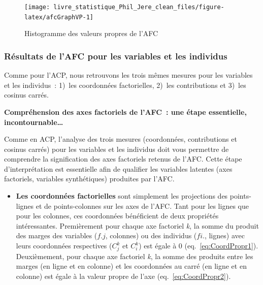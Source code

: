 \documentclass[
  11pt,
  french,
]{book}
\makeatletter
\providecommand{\tightlist}{%
  \setlength{\itemsep}{0pt}\setlength{\parskip}{0pt}}
\newenvironment{kframev}{%
\medskip{}
\setlength{\fboxsep}{.8em}
 \def\at@end@of@kframev{}%
 \ifinner\ifhmode%
  \def\at@end@of@kframev{\end{minipage}}%
  \begin{minipage}{\columnwidth}%
 \fi\fi%
 \def\FrameCommand##1{\hskip\@totalleftmargin \hskip-\fboxsep
 \colorbox{shadebluecolor}{##1}\hskip-\fboxsep
     \hskip-\linewidth \hskip-\@totalleftmargin \hskip\columnwidth}%
 \MakeFramed {\advance\hsize-\width
   \@totalleftmargin\z@ \linewidth\hsize
   \@setminipage}}%
 {\par\unskip\endMakeFramed%
 \at@end@of@kframev}
\newenvironment{rmdblock}[1]
  {
  \begin{itemize}
  \renewcommand{\labelitemi}{
    \raisebox{-.7\height}[0pt][0pt]{
      {\setkeys{Gin}{width=3em,keepaspectratio}\texttt{[image: images/\#1]}}
    }
  }
  \setlength{\fboxsep}{1em}
  \begin{kframev}
  \small
  \item
  }
  {
  \end{kframev}
  \end{itemize}
  }
\newenvironment{bloc_objectif}
  {\begin{rmdblock}{objectif}}
  {\end{rmdblock}}
\makeatother
\begin{document}
\begin{figure}

{\centering \texttt{[image: livre\_statistique\_Phil\_Jere\_clean\_files/figure-latex/afcGraphVP-1]} 

}

\caption{Histogramme des valeurs propres de l'AFC}\label{fig:afcGraphVP}
\end{figure}

\hypertarget{sect12322}{%
\subsubsection{Résultats de l'AFC pour les variables et les individus}\label{sect12322}}

Comme pour l'ACP, nous retrouvons les trois mêmes mesures pour les variables et les individus~: 1)~les coordonnées factorielles, 2)~les contributions et 3)~les cosinus carrés.

\begin{bloc_objectif}
\textbf{Compréhension des axes factoriels de l'AFC~: une étape essentielle, incontournable\ldots{}}

Comme en ACP, l'analyse des trois mesures (coordonnées, contributions et cosinus carrés) pour les variables et les individus doit vous permettre de comprendre la signification des axes factoriels retenus de l'AFC. Cette étape d'interprétation est essentielle afin de qualifier les variables latentes (axes factoriels, variables synthétiques) produites par l'AFC.

\end{bloc_objectif}

\begin{itemize}
\tightlist
\item
  \textbf{Les coordonnées factorielles} sont simplement les projections des points-lignes et de points-colonnes sur les axes de l'AFC. Tant pour les lignes que pour les colonnes, ces coordonnées bénéficient de deux propriétés intéressantes. Premièrement pour chaque axe factoriel \emph{k}, la somme du produit des marges des variables (\(f.j\), colonnes) ou des individus (\(fi.\), lignes) avec leurs coordonnées respectives (\(C^k_j\) et \(C^k_i\)) est égale à 0 (eq.~\eqref{eq:CoordPropr1}). Deuxièmement, pour chaque axe factoriel \emph{k}, la somme des produits entre les marges (en ligne et en colonne) et les coordonnées au carré (en ligne et en colonne) est égale à la valeur propre de l'axe (eq.~\eqref{eq:CoordPropr2}).
\end{itemize}
\end{document}
